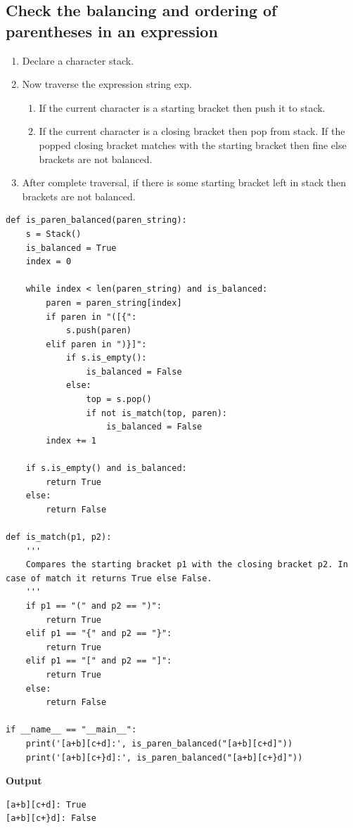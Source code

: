 \documentclass[a4paper,11pt]{book}
\begin{document}
\subsection{Check the balancing and ordering of parentheses in an expression}

\begin{enumerate}
    \item Declare a character stack.
    \item Now traverse the expression string exp. 
    \begin{enumerate}
        \item If the current character is a starting bracket then push it to stack.
        \item If the current character is a closing bracket then pop from stack. If the popped closing bracket matches with the starting bracket then fine else brackets are not balanced.
    \end{enumerate}
    \item After complete traversal, if there is some starting bracket left in stack then brackets are not balanced.
\end{enumerate}

\begin{lstlisting}
def is_paren_balanced(paren_string):
    s = Stack()
    is_balanced = True
    index = 0

    while index < len(paren_string) and is_balanced:
        paren = paren_string[index]
        if paren in "([{":
            s.push(paren)
        elif paren in ")}]":
            if s.is_empty():
                is_balanced = False
            else:
                top = s.pop()
                if not is_match(top, paren):
                    is_balanced = False
        index += 1

    if s.is_empty() and is_balanced:
        return True
    else:
        return False

def is_match(p1, p2):
    '''
    Compares the starting bracket p1 with the closing bracket p2. In case of match it returns True else False.
    '''
    if p1 == "(" and p2 == ")":
        return True
    elif p1 == "{" and p2 == "}":
        return True
    elif p1 == "[" and p2 == "]":
        return True
    else:
        return False
        
if __name__ == "__main__":
    print('[a+b][c+d]:', is_paren_balanced("[a+b][c+d]")) 
    print('[a+b][c+}d]:', is_paren_balanced("[a+b][c+}d]")) 
\end{lstlisting}
\textbf{Output}
\begin{lstlisting}
[a+b][c+d]: True
[a+b][c+}d]: False
\end{lstlisting}
\end{document}
